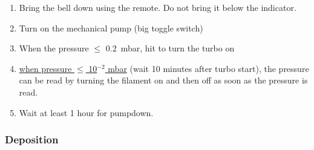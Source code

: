 \documentclass[12pt,a4paper]{report}
\begin{document}
\begin{enumerate}
\item Bring the bell down using the remote. Do not bring it below the indicator.
\item Turn on the mechanical pump (big toggle switch)
\item When the pressure $\leq$ \SI{0.2}{\milli\bar}, hit  to turn the turbo on\\
\item \underline{when pressure $\leq$ 10$^{-2}$ mbar} (wait 10 minutes after turbo start), the pressure can be read by turning the filament on and then off as soon as the pressure is read.\\
\item Wait at least 1 hour for pumpdown.
\end{enumerate}
\subsubsection{Deposition}
\end{document}
